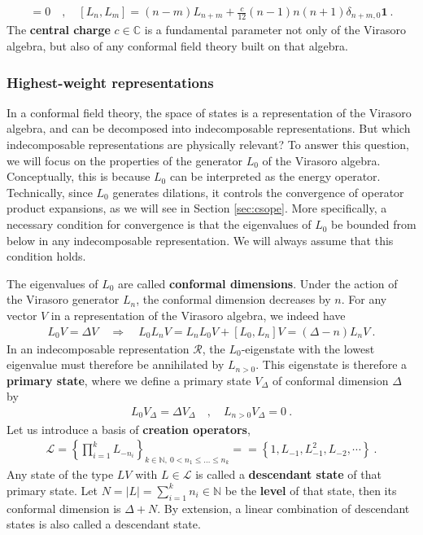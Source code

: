 \documentclass[12pt, a4paper]{article}
\theoremstyle{break}
\begin{document}
 \begin{align}
  [\mathbf 1, L_n] = 0 \quad , \quad \boxed{[L_n,L_m] = (n-m)L_{n+m} +\frac{c}{12}(n-1)n(n+1)\delta_{n+m,0}\mathbf 1} \ .
  \label{vir}
 \end{align}
 The \textbf{central charge} $c\in\mathbb{C}$ is a fundamental parameter not only of the Virasoro algebra, but also of any conformal field theory built on that algebra. 

\subsubsection{Highest-weight representations}\label{sec:hwr}

In a conformal field theory, the space of states is a representation of the Virasoro algebra, and can be decomposed into indecomposable representations. But which indecomposable representations are physically relevant? To answer this question, we will focus on the properties of the generator $L_0$ of the Virasoro algebra. Conceptually, this is because $L_0$ can be interpreted as the energy operator. Technically, since $L_0$ generates dilations, it controls the convergence of operator product expansions, as we will see in Section \ref{sec:csope}. More specifically, a necessary condition for convergence is that the eigenvalues of $L_0$ be bounded from below in any indecomposable representation. We will always assume that this condition holds.

The eigenvalues of $L_0$ are called \textbf{conformal dimensions}. Under the action of the Virasoro generator $L_n$, the conformal dimension decreases by $n$. For any vector $V$ in a representation of the Virasoro algebra, we indeed have 
\begin{align}
 L_0V{} = \Delta V{} \quad \Rightarrow\quad  L_0 L_nV{} = L_nL_0V{} + [L_0, L_n] V{}  = (\Delta-n)L_nV{} \ .
\end{align}
In an indecomposable representation $\mathcal{R}$, the $L_0$-eigenstate with the lowest eigenvalue must therefore be annihilated by $L_{n>0}$. This eigenstate is therefore a \textbf{primary state}, where we define a primary state $V_\Delta$ of conformal dimension $\Delta$ by 
\begin{align}
  \boxed{L_0 V_\Delta = \Delta V_\Delta \quad , \quad L_{n>0} V_\Delta = 0}\ .
 \end{align}
Let us introduce a basis of \textbf{creation operators},
\begin{align}
 \mathcal{L} = \left\{\prod_{i=1}^k L_{-n_i} \right\}_{k\in\mathbb{N},\ 0<n_1\leq \dots \leq n_k}==\left\{1, L_{-1}, L_{-1}^2, L_{-2},\cdots \right\}\ .
 \label{lcm}
\end{align}
Any state of the type $L V{}$ with $L\in\mathcal{L}$ is called a \textbf{descendant state} of that primary state. Let  $N=|L|=\sum_{i=1}^k n_i \in\mathbb{N}$ be the  \textbf{level} of that state, then its conformal dimension is $\Delta+N$. By extension, a linear combination of descendant states is also called a descendant state. 
\end{document}
